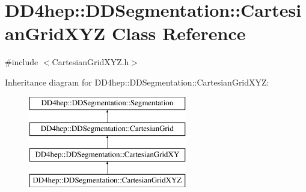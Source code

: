 \hypertarget{class_d_d4hep_1_1_d_d_segmentation_1_1_cartesian_grid_x_y_z}{}\section{D\+D4hep\+:\+:D\+D\+Segmentation\+:\+:Cartesian\+Grid\+X\+YZ Class Reference}
\label{class_d_d4hep_1_1_d_d_segmentation_1_1_cartesian_grid_x_y_z}


{\ttfamily \#include $<$Cartesian\+Grid\+X\+Y\+Z.\+h$>$}

Inheritance diagram for D\+D4hep\+:\+:D\+D\+Segmentation\+:\+:Cartesian\+Grid\+X\+YZ\+:\begin{figure}[H]
\begin{center}
\leavevmode
\includegraphics[height=4.000000cm]{class_d_d4hep_1_1_d_d_segmentation_1_1_cartesian_grid_x_y_z}
\end{center}
\end{figure}
